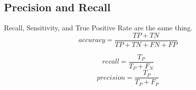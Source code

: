 	\subsection{Precision and Recall}
Recall, Sensitivity, and True Positive Rate are the same thing.
	\begin{equation}
		accuracy = \frac{TP + TN}{TP + TN + FN + FP}
	\end{equation}

	\begin{equation}
		recall = \frac{T_P}{T_P + F_N}
	\end{equation}
	\begin{equation}
		precision = \frac{T_P}{T_P + F_P}
	\end{equation}
	\begin{mathwhere}[0.49in]
	\end{mathwhere}